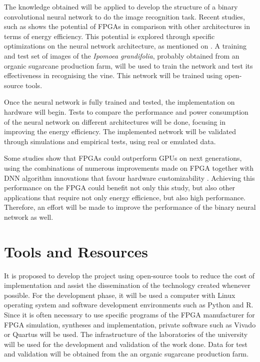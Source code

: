 \documentclass[
    12pt,                       %
    oneside,                    %
    a4paper,                    %
    brazil,                     %
    french,                     %
    spanish,                    %
    english,                    %
    ]{abntex2}
\begin{document}
The knowledge obtained will be applied to develop the structure of a binary convolutional neural network to do the image recognition task. Recent studies, such as \textcite{Nurvitadhi2017_0} shows the potential of FPGAs in comparison with other architectures in terms of energy efficiency. This potential is explored through specific optimizations on the neural network architecture, as mentioned on \textcites{Courbariaux2015, Zhang2017}. A training and test set of images of the \textit{Ipomoea grandifolia}, probably obtained from an organic sugarcane production farm, will be used to train the network and test its effectiveness in recognising the vine. This network will be trained using open-source tools.

Once the neural network is fully trained and tested, the implementation on hardware will begin. Tests to compare the performance and power consumption of the neural network on different architectures will be done, focusing in improving the energy efficiency. The implemented network will be validated through simulations and empirical tests, using real or emulated data.

Some studies show that FPGAs could outperform GPUs on next generations, using the combinations of numerous improvements made on FPGA together with DNN algorithm innovations that favour hardware customizability \cite{Nurvitadhi2017_1}. Achieving this performance on the FPGA could benefit not only this study, but also other applications that require not only energy efficience, but also high performance. Therefore, an effort will be made to improve the performance of the binary neural network as well.

\section{Tools and Resources}

  It is proposed to develop the project using open-source tools to reduce the cost of implementation and assist the dissemination of the technology created whenever possible. For the development phase, it will be used a computer with Linux operating system and software development environments such as Python and R. Since it is often necessary to use specific programs of the FPGA manufacturer for FPGA simulation, syntheses and implementation, private software such as Vivado or Quartus will be used. The infrastructure of the laboratories of the university will be used for the development and validation of the work done. Data for test and validation will be obtained from the an organic sugarcane production farm.
\end{document}
